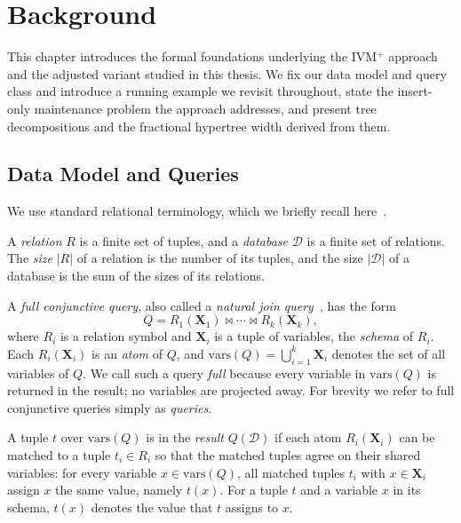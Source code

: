 \chapter{Background}
\label{ch:background}

This chapter introduces the formal foundations underlying the IVM$^+$ approach and the adjusted variant studied in this thesis.
We fix our data model and query class and introduce a running example we revisit throughout, state the insert-only maintenance problem the approach addresses, and present tree decompositions and the fractional hypertree width derived from them.

\section{Data Model and Queries}
\label{sec:queries}

We use standard relational terminology, which we briefly recall here~\cite{abiteboul1995}.

\medskip

A \emph{relation} $R$ is a finite set of tuples, and a \emph{database} $\mathcal{D}$ is a finite set of relations.
The \emph{size} $|R|$ of a relation is the number of its tuples, and the size $|\mathcal{D}|$ of a database is the sum of the sizes of its relations.

\medskip

A \emph{full conjunctive query}, also called a \emph{natural join query}~\cite{abokhamis2024Insert-Only}, has the form
\[
Q = R_1(\mathbf{X}_1) \bowtie \cdots \bowtie R_k(\mathbf{X}_k),
\] 
where $R_i$ is a relation symbol and $\mathbf{X}_i$ is a tuple of variables, the \emph{schema} of $R_i$. Each $R_i(\mathbf{X}_i)$ is an \emph{atom} of $Q$, and $\mathrm{vars}(Q) = \bigcup_{i=1}^{k} \mathbf{X}_i$ denotes the set of all variables of $Q$.
We call such a query \emph{full} because every variable in $\mathrm{vars}(Q)$ is returned in the result; no variables are projected away.
For brevity we refer to full conjunctive queries simply as \emph{queries}.

A tuple $t$ over $\mathrm{vars}(Q)$ is in the \emph{result} $Q(\mathcal{D})$ if each atom $R_i(\mathbf{X}_i)$ can be matched to a tuple $t_i \in R_i$ so that the matched tuples agree on their shared variables: for every variable $x \in \mathrm{vars}(Q)$, all matched tuples $t_i$ with $x \in \mathbf{X}_i$ assign $x$ the same value, namely $t(x)$.
For a tuple $t$ and a variable $x$ in its schema, $t(x)$ denotes the value that $t$ assigns to $x$.

